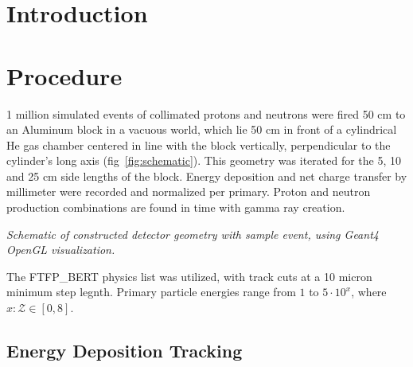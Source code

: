 \documentclass[11pt]{article}
\makeatletter
\newenvironment{figurehere}
{\def\@captype{figure}}{}
\makeatother
\begin{document}
\begin{multicols}{2}

\section{Introduction}

\section{Procedure}

1 million simulated events of collimated protons and neutrons were fired 50 cm to an Aluminum block in a vacuous world, which lie 50 cm in front of a cylindrical He gas chamber centered in line with the block vertically, perpendicular to the cylinder's long axis (fig~\ref{fig:schematic}).  This geometry was iterated for the 5, 10 and 25 cm side lengths of the block.  Energy deposition and net charge transfer by millimeter were recorded and normalized per primary.  Proton and neutron production combinations are found in time with gamma ray creation.

\begin{figurehere}
\centering
{}
\caption{\label{fig:schematic}\small \emph{Schematic of constructed detector geometry with sample event, using Geant4 OpenGL visualization.}}
\end{figurehere}

The FTFP\_BERT physics list was utilized\cite{Geant4:physicsList}, with track cuts at a 10 micron minimum step legnth.  Primary particle energies range from $1$ to $5\cdot10^x$, where $x:\mathcal{Z}\in[0,8]$.

\subsection{Energy Deposition Tracking}


\end{multicols}
\end{document}

